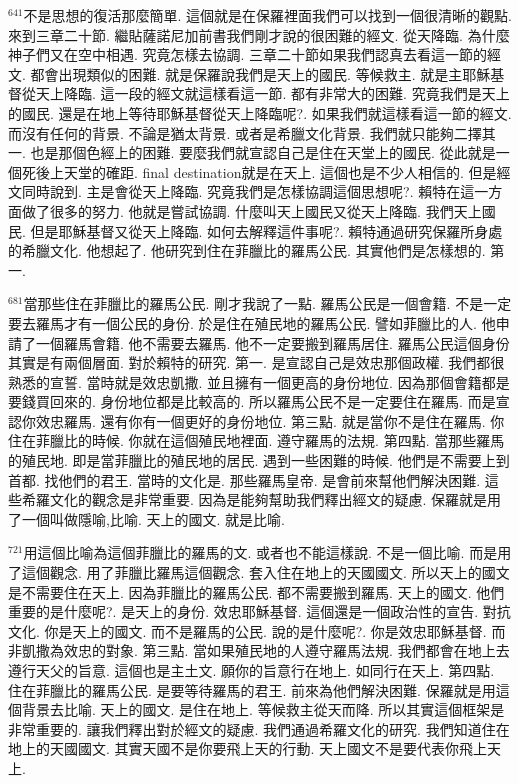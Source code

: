 \documentclass{book}
\begin{document}
$^{641}$不是思想的復活那麼簡單.
這個就是在保羅裡面我們可以找到一個很清晰的觀點.
來到三章二十節.
繼貼薩諾尼加前書我們剛才說的很困難的經文.
從天降臨.
為什麼神子們又在空中相遇.
究竟怎樣去協調.
三章二十節如果我們認真去看這一節的經文.
都會出現類似的困難.
就是保羅說我們是天上的國民.
等候救主.
就是主耶穌基督從天上降臨.
這一段的經文就這樣看這一節.
都有非常大的困難.
究竟我們是天上的國民.
還是在地上等待耶穌基督從天上降臨呢?.
如果我們就這樣看這一節的經文.
而沒有任何的背景.
不論是猶太背景.
或者是希臘文化背景.
我們就只能夠二擇其一.
也是那個色經上的困難.
要麼我們就宣認自己是住在天堂上的國民.
從此就是一個死後上天堂的確距.
final destination就是在天上.
這個也是不少人相信的.
但是經文同時說到.
主是會從天上降臨.
究竟我們是怎樣協調這個思想呢?.
賴特在這一方面做了很多的努力.
他就是嘗試協調.
什麼叫天上國民又從天上降臨.
我們天上國民.
但是耶穌基督又從天上降臨.
如何去解釋這件事呢?.
賴特通過研究保羅所身處的希臘文化.
他想起了.
他研究到住在菲臘比的羅馬公民.
其實他們是怎樣想的.
第一.

$^{681}$當那些住在菲臘比的羅馬公民.
剛才我說了一點.
羅馬公民是一個會籍.
不是一定要去羅馬才有一個公民的身份.
於是住在殖民地的羅馬公民.
譬如菲臘比的人.
他申請了一個羅馬會籍.
他不需要去羅馬.
他不一定要搬到羅馬居住.
羅馬公民這個身份其實是有兩個層面.
對於賴特的研究.
第一.
是宣認自己是效忠那個政權.
我們都很熟悉的宣誓.
當時就是效忠凱撒.
並且擁有一個更高的身份地位.
因為那個會籍都是要錢買回來的.
身份地位都是比較高的.
所以羅馬公民不是一定要住在羅馬.
而是宣認你效忠羅馬.
還有你有一個更好的身份地位.
第三點.
就是當你不是住在羅馬.
你住在菲臘比的時候.
你就在這個殖民地裡面.
遵守羅馬的法規.
第四點.
當那些羅馬的殖民地.
即是當菲臘比的殖民地的居民.
遇到一些困難的時候.
他們是不需要上到首都.
找他們的君王.
當時的文化是.
那些羅馬皇帝.
是會前來幫他們解決困難.
這些希羅文化的觀念是非常重要.
因為是能夠幫助我們釋出經文的疑慮.
保羅就是用了一個叫做隱喻,比喻.
天上的國文.
就是比喻.

$^{721}$用這個比喻為這個菲臘比的羅馬的文.
或者也不能這樣說.
不是一個比喻.
而是用了這個觀念.
用了菲臘比羅馬這個觀念.
套入住在地上的天國國文.
所以天上的國文是不需要住在天上.
因為菲臘比的羅馬公民.
都不需要搬到羅馬.
天上的國文.
他們重要的是什麼呢?.
是天上的身份.
效忠耶穌基督.
這個還是一個政治性的宣告.
對抗文化.
你是天上的國文.
而不是羅馬的公民.
說的是什麼呢?.
你是效忠耶穌基督.
而非凱撒為效忠的對象.
第三點.
當如果殖民地的人遵守羅馬法規.
我們都會在地上去遵行天父的旨意.
這個也是主土文.
願你的旨意行在地上.
如同行在天上.
第四點.
住在菲臘比的羅馬公民.
是要等待羅馬的君王.
前來為他們解決困難.
保羅就是用這個背景去比喻.
天上的國文.
是住在地上.
等候救主從天而降.
所以其實這個框架是非常重要的.
讓我們釋出對於經文的疑慮.
我們通過希羅文化的研究.
我們知道住在地上的天國國文.
其實天國不是你要飛上天的行動.
天上國文不是要代表你飛上天上.
\end{document}

